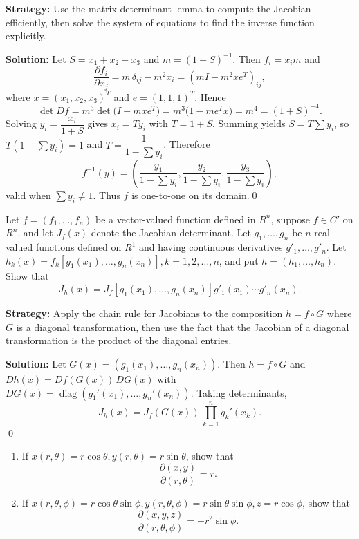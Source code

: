 \noindent\textbf{Strategy:} Use the matrix determinant lemma to compute the Jacobian efficiently, then solve the system of equations to find the inverse function explicitly.

\bigskip\noindent\textbf{Solution:}
Let $S=x_1+x_2+x_3$ and $m=(1+S)^{-1}$. Then $f_i=x_im$ and
\[\frac{\partial f_i}{\partial x_j}=m\,\delta_{ij}-m^2 x_i=(mI-m^2xe^{\!T})_{ij},\]
where $x=(x_1,x_2,x_3)^{\!T}$ and $e=(1,1,1)^{\!T}$. Hence
\[\det Df=m^3\det\big(I-mxe^{\!T}\big)=m^3\big(1-me^{\!T}x\big)=m^4=(1+S)^{-4}.
\]
Solving $y_i=\dfrac{x_i}{1+S}$ gives $x_i=Ty_i$ with $T=1+S$. Summing yields $S=T\sum y_i$, so $T(1-\sum y_i)=1$ and $T=\dfrac{1}{1-\sum y_i}$. Therefore
\[f^{-1}(y)=\left(\frac{y_1}{1-\sum y_i},\frac{y_2}{1-\sum y_i},\frac{y_3}{1-\sum y_i}\right),\]
valid when $\sum y_i\neq 1$. Thus $f$ is one-to-one on its domain.\qed


\begin{problembox}
\begin{problemstatement}
Let \( f = (f_1, \ldots, f_n) \) be a vector-valued function defined in \( R^n \), suppose \( f \in C' \) on \( R^n \), and let \( J_f(x) \) denote the Jacobian determinant. Let \( g_1, \ldots, g_n \) be \( n \) real-valued functions defined on \( R^1 \) and having continuous derivatives \( g'_1, \ldots, g'_n \). Let \( h_k(x) = f_k[g_1(x_1), \ldots, g_n(x_n)], k = 1, 2, \ldots, n \), and put \( h = (h_1, \ldots, h_n) \). Show that
\[J_h(x) = J_f[g_1(x_1), \ldots, g_n(x_n)]g'_1(x_1) \cdots g'_n(x_n).\]
\end{problemstatement}
\end{problembox}

\noindent\textbf{Strategy:} Apply the chain rule for Jacobians to the composition $h=f\circ G$ where $G$ is a diagonal transformation, then use the fact that the Jacobian of a diagonal transformation is the product of the diagonal entries.

\bigskip\noindent\textbf{Solution:}
Let $G(x)=(g_1(x_1),\dots,g_n(x_n))$. Then $h=f\circ G$ and $Dh(x)=Df(G(x))\,DG(x)$ with $DG(x)=\operatorname{diag}(g_1'(x_1),\dots,g_n'(x_n))$. Taking determinants,
\[J_h(x)=J_f(G(x))\,\prod_{k=1}^n g_k'(x_k).
\]\qed


\begin{problembox}
\begin{problemstatement}
\begin{enumerate}[label=(\alph*)]
    \item If \( x(r, \theta) = r \cos \theta, y(r, \theta) = r \sin \theta \), show that
    \[\frac{\partial (x, y)}{\partial (r, \theta)} = r.\]
    \item If \( x(r, \theta, \phi) = r \cos \theta \sin \phi, y(r, \theta, \phi) = r \sin \theta \sin \phi, z = r \cos \phi \), show that
    \[\frac{\partial (x, y, z)}{\partial (r, \theta, \phi)} = -r^2 \sin \phi.\]
\end{enumerate}
\end{problemstatement}
\end{problembox}

